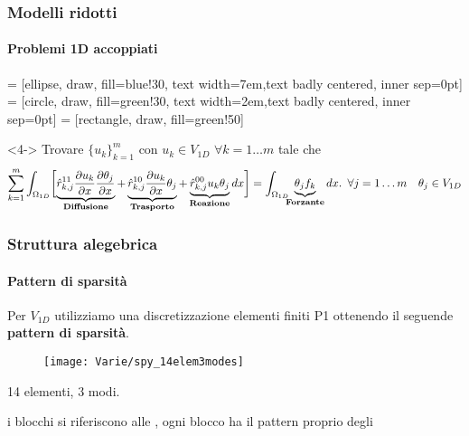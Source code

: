  \begin{frame}
  \frametitle{Modelli ridotti}
  \framesubtitle{Problemi 1D accoppiati}
 \begin{center}
   = [ellipse, draw, fill=blue!30, 
    text width=7em,text badly centered, inner sep=0pt]
   = [circle, draw, fill=green!30, 
    text width=2em,text badly centered, inner sep=0pt]
    = [rectangle, draw, fill=green!50]
 \end{center}
 \begin{exampleblock}<4->{}
Trovare $\{u_k\}_{k=1}^m$ con $u_k\in V_{1D}\,\,\forall k=1\ldots m$ tale che
  {\footnotesize
\begin{equation}
\label{eq:modalreducedcoeff}
 \sum_{k=1}^m\int_{\Omega_{1D}}
 \biggl[
 \underbrace{\hat r^{11}_{k,j}\dpar{ u_k}{x}\dpar{\theta_j}{x}}_{\textbf{Diffusione}}
+\underbrace{\hat r^{10}_{k,j}\dpar{ u_k}{x}\theta_j}_{\textbf{Trasporto}}
+\underbrace{\hat r^{00}_{k,j} u_k\theta_j}_{\textbf{Reazione}}
dx\biggr]=\int_{\Omega_{1D}}\nsp{2}\underbrace{\theta_jf_k}_{\textbf{Forzante}} dx. \psp{3}\forall j=1\ldots m\quad\theta_j\in V_{1D} 
\end{equation}}
\end{exampleblock}
 \end{frame}
 \begin{frame}
  \frametitle{Struttura alegebrica}
  \framesubtitle{Pattern di sparsit\`a}
  Per $V_{1D}$ utilizziamo una discretizzazione elementi finiti P1 ottenendo il seguende 
  \textbf{pattern di 
  sparsit\`a}.
  
  \begin{figure}
   \centering
  \texttt{[image: Varie/spy\_14elem3modes]}
 
  \end{figure}
  \begin{center} 14 elementi, 3 modi.\end{center}
  
  \textbf{} i blocchi si riferiscono alle , ogni blocco ha il pattern proprio degli 
 \end{frame}

